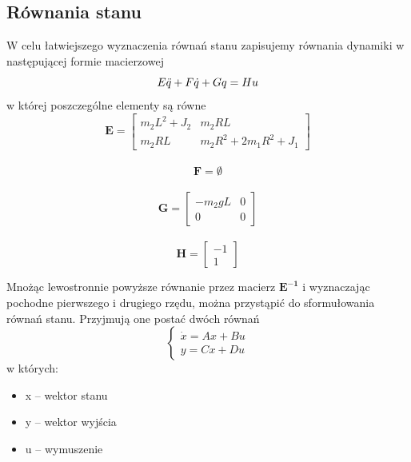 \subsection{Równania stanu}

W celu łatwiejszego wyznaczenia równań stanu zapisujemy równania dynamiki w następującej formie macierzowej  
$$
E\Ddot{q} + F\dot{q} + Gq = Hu 
$$
w której poszczególne elementy są równe
$$
\mathbf{E} = 
\left[ \begin{array}{cc}
m_2L^2 + J_2 & m_2RL \\
m_2RL & m_2R^2 + 2m_1R^2 + J_1
\end{array} \right]
$$
\\
$$
\mathbf{F} = \emptyset
$$
\\
$$
\mathbf{G} = 
\left[ \begin{array}{cc}
-m_2gL & 0 \\
0 & 0
\end{array} \right]
$$
\\
$$
\mathbf{H} = 
\left[ \begin{array}{c}
-1 \\
1
\end{array} \right]
$$

Mnożąc lewostronnie powyższe równanie przez macierz $\mathbf{E^{-1}}$ i wyznaczając pochodne pierwszego i drugiego rzędu, można przystąpić do sformułowania równań stanu. Przyjmują one postać dwóch równań
\begin{equation}
    \left\{
    \begin{array}{ll}
    \dot{x} = Ax + Bu \\
    y = Cx + Du
    \end{array}
    \right.
\end{equation}
w których:
\begin{itemize}
    \item x -- wektor stanu
    \item y -- wektor wyjścia
    \item u -- wymuszenie
\end{itemize}

